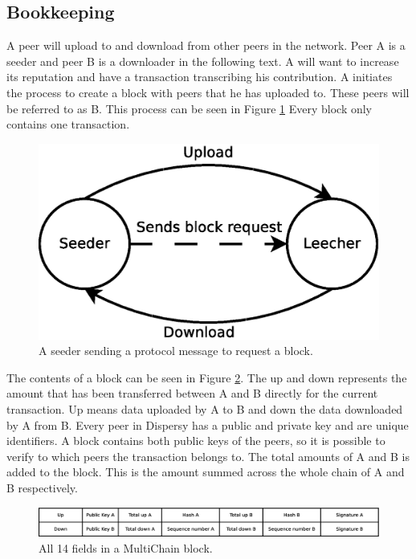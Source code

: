 \subsection{Bookkeeping}
A peer will upload to and download from other peers in the network.
Peer A is a seeder and peer B is a downloader in the following text.
A will want to increase its reputation and have a transaction transcribing his contribution.
A initiates the process to create a block with peers that he has uploaded to.
These peers will be referred to as B.
This process can be seen in Figure \ref{fig:seeder-downloader}
Every block only contains one transaction.

\begin{figure}
	\centerline{\includegraphics[scale=0.3]{design/figs/seeder-downloader.eps}}
	\caption{A seeder sending a protocol message to request a block.}
	\label{fig:seeder-downloader}
\end{figure}

The contents of a block can be seen in Figure \ref{fig:block}.
The up and down represents the amount that has been transferred between A and B directly for the current transaction.
Up means data uploaded by A to B and down the data downloaded by A from B.
Every peer in Dispersy has a public and private key and are unique identifiers.
A block contains both public keys of the peers,
so it is possible to verify to which peers the transaction belongs to.
The total amounts of A and B is added to the block.
This is the amount summed across the whole chain of A and B respectively.

\begin{figure}
	\centerline{\includegraphics[scale=0.3]{design/figs/block.eps}}
	\caption{All 14 fields in a MultiChain block.}
	\label{fig:block}
\end{figure}

